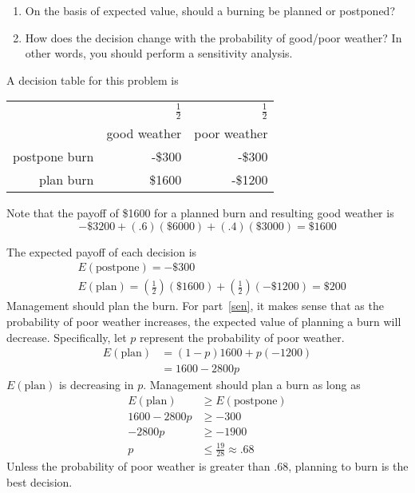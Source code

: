 \begin{enumerate}
  \begin{enumerate}
  \item On the basis of expected value, should a burning
    be planned or postponed?
  \item How does the decision change with the probability of good/poor
    weather? \label{sen} In other words, you should perform a
    sensitivity analysis.
  \end{enumerate}

\begin{solution}
\bs
A decision table for this problem is

\begin{center}
\begin{tabular}{rrr}
    & $\frac{1}{2}$ & $\frac{1}{2}$ \\
    & good weather & poor weather \\ \hline
    postpone burn & -\$300 & -\$300 \\
    plan burn & \$1600 & -\$1200
\end{tabular}
\end{center}

Note that the payoff of \$1600 for a planned burn and resulting good weather is
\[
-\$3200 + (.6)(\$6000) + (.4)(\$3000) = \$1600
\]

The expected payoff of each decision is
\begin{align*}
&E(\text{postpone}) = -\$300 \\
&E(\text{plan}) = \left(\frac{1}{2}\right)(\$1600)
   + \left(\frac{1}{2}\right)(-\$1200) = \$200
\end{align*}
Management should plan the burn. For part~\ref{sen}, it
makes sense that as the probability of poor weather
increases, the expected value of planning a burn will
decrease. Specifically, let $p$ represent the probability
of poor weather.
\begin{align*}
  E(\text{plan}) &= (1-p)1600 + p(-1200) \\
  &= 1600 - 2800p
\end{align*}
$E(\text{plan})$ is decreasing in $p$. Management should
plan a burn as long as
\begin{align*}
  E(\text{plan}) &\geq E(\text{postpone}) \\
  1600 - 2800p &\geq -300 \\
  -2800p &\geq -1900 \\
  p &\leq \frac{19}{28} \approx .68
\end{align*}
Unless the probability of poor weather is greater than .68,
planning to burn is the best decision. 
\end{solution}


\end{enumerate}
